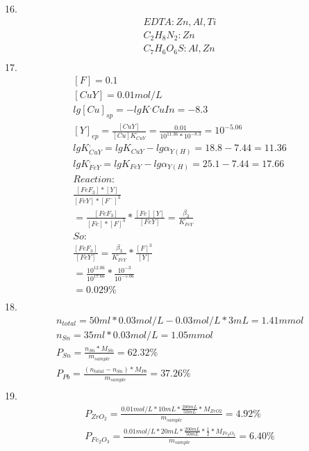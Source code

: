 \documentclass{article}
\begin{document}
16.\begin{equation}
    \begin{multlined}
        EDTA: Zn, Al, Ti\\
        C_2H_8N_2: Zn\\
        C_7H_6O_6S: Al, Zn\\
    \end{multlined}
\end{equation}
17.\begin{equation}
    \begin{multlined}
        \left[F\right] = 0.1\\
        [CuY] = 0.01 mol/L\\
        lg [Cu]_{sp} = -lgK^,CuIn = -8.3\\
        [Y]_{ep} = \frac{[CuY]}{[Cu]K^,_{CuY}} = \frac{0.01}{10^{11.36}*10^{-8.3}} = 10^{-5.06}\\
        lg K^,_{CuY} = lg K_{CuY} - lg \alpha_{Y(H)} = 18.8 - 7.44 = 11.36\\
        lg K^,_{FeY} = lg K_{FeY} -  lg \alpha_{Y(H)} = 25.1 - 7.44 = 17.66\\
        Reaction:\\
        \frac{[FeF_3]*[Y]}{[FeY]*[F^-]^3}\\
        = \frac{[FeF_3]}{[Fe]*[F]^3}*\frac{[Fe][Y]}{[FeY]} = \frac{\beta_3}{K^,_{FeY}}\\
        So:\\
        \frac{[FeF_3]}{[FeY]} = \frac{\beta_3}{K^,_{FeY}}*\frac{[F]^3}{[Y]}\\
        = \frac{10^{12.06}}{10^{17.66}}*\frac{10^{-3}}{10^{-5.06}}\\
        = 0.029\%\\
    \end{multlined}
\end{equation}
18.\begin{equation}
    \begin{multlined}
        n_{total} = 50ml*0.03mol/L - 0.03mol/L*3mL = 1.41mmol\\
        n_{Sn} = 35ml * 0.03mol/L = 1.05mmol\\
        P_{Sn} = \frac{n_{Sn}* M_{Sn}}{m_{sample}} = 62.32\%\\
        P_{Pb} = \frac{(n_{total} - n_{Sn})* M_{Pb}}{m_{sample}} = 37.26\%\\
    \end{multlined}
\end{equation}
19.\begin{equation}
    \begin{multlined}
        P_{ZrO_2} = \frac{0.01mol/L*10mL*\frac{200mL}{50mL}*M_{ZrO2}}{m_{sample}} = 4.92\%\\
        P_{Fe_2O_3} = \frac{0.01mol/L*20mL*\frac{200mL}{50mL}*\frac{1}{2}*M_{Fe_2O_3}}{m_{sample}} = 6.40\%\\
    \end{multlined}
\end{equation}
\end{document}

